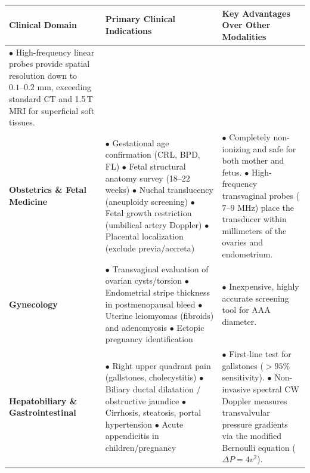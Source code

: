 \documentclass[11pt,a4paper]{article}
\begin{document}
\begin{longtable}{p{3.2cm}p{6cm}p{6cm}}
\toprule
\textbf{Clinical Domain} & \textbf{Primary Clinical Indications} & \textbf{Key Advantages Over Other Modalities} \\
\midrule
\endfirsthead
\toprule
$\bullet$ High-frequency linear probes provide spatial resolution down to $0.1\text{--}0.2\text{ mm}$, exceeding standard CT and 1.5\,T MRI for superficial soft tissues. \\
\midrule
\endhead
\bottomrule
\endfoot
\textbf{Obstetrics \& Fetal Medicine} & 
$\bullet$ Gestational age confirmation (CRL, BPD, FL)\newline
$\bullet$ Fetal structural anatomy survey (18--22 weeks)\newline
$\bullet$ Nuchal translucency (aneuploidy screening)\newline
$\bullet$ Fetal growth restriction (umbilical artery Doppler)\newline
$\bullet$ Placental localization (exclude previa/accreta) & 
$\bullet$ Completely non-ionizing and safe for both mother and fetus.\newline
$\bullet$ High-frequency transvaginal probes ($7\text{--}9\text{ MHz}$) place the transducer within millimeters of the ovaries and endometrium. \\
\midrule
\textbf{Gynecology} & 
$\bullet$ Transvaginal evaluation of ovarian cysts/torsion\newline
$\bullet$ Endometrial stripe thickness in postmenopausal bleed\newline
$\bullet$ Uterine leiomyomas (fibroids) and adenomyosis\newline
$\bullet$ Ectopic pregnancy identification & 
$\bullet$ Inexpensive, highly accurate screening tool for AAA diameter. \\
\midrule
\textbf{Hepatobiliary \& Gastrointestinal} & 
$\bullet$ Right upper quadrant pain (gallstones, cholecystitis)\newline
$\bullet$ Biliary ductal dilatation / obstructive jaundice\newline
$\bullet$ Cirrhosis, steatosis, portal hypertension\newline
$\bullet$ Acute appendicitis in children/pregnancy & 
$\bullet$ First-line test for gallstones ($>95\%$ sensitivity).\newline
$\bullet$ Non-invasive spectral CW Doppler measures transvalvular pressure gradients via the modified Bernoulli equation ($\Delta P = 4v^2$). \\
\midrule

\end{longtable}
\end{document}
